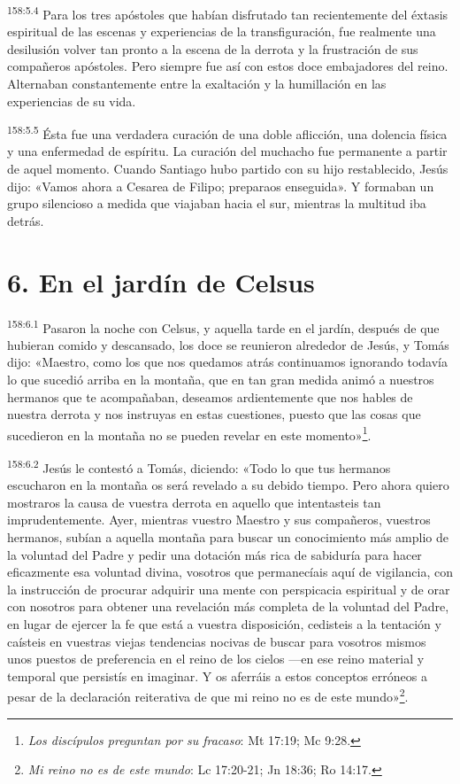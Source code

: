 \par
\textsuperscript{158:5.4} Para los tres apóstoles que habían disfrutado tan recientemente del éxtasis espiritual de las escenas y experiencias de la transfiguración, fue realmente una desilusión volver tan pronto a la escena de la derrota y la frustración de sus compañeros apóstoles. Pero siempre fue así con estos doce embajadores del reino. Alternaban constantemente entre la exaltación y la humillación en las experiencias de su vida.

\par
\textsuperscript{158:5.5} Ésta fue una verdadera curación de una doble aflicción, una dolencia física y una enfermedad de espíritu. La curación del muchacho fue permanente a partir de aquel momento. Cuando Santiago hubo partido con su hijo restablecido, Jesús dijo: «Vamos ahora a Cesarea de Filipo; preparaos enseguida». Y formaban un grupo silencioso a medida que viajaban hacia el sur, mientras la multitud iba detrás.

\section*{6. En el jardín de Celsus}
\par
\textsuperscript{158:6.1} Pasaron la noche con Celsus, y aquella tarde en el jardín, después de que hubieran comido y descansado, los doce se reunieron alrededor de Jesús, y Tomás dijo: «Maestro, como los que nos quedamos atrás continuamos ignorando todavía lo que sucedió arriba en la montaña, que en tan gran medida animó a nuestros hermanos que te acompañaban, deseamos ardientemente que nos hables de nuestra derrota y nos instruyas en estas cuestiones, puesto que las cosas que sucedieron en la montaña no se pueden revelar en este momento»\footnote{\textit{Los discípulos preguntan por su fracaso}: Mt 17:19; Mc 9:28.}.

\par
\textsuperscript{158:6.2} Jesús le contestó a Tomás, diciendo: «Todo lo que tus hermanos escucharon en la montaña os será revelado a su debido tiempo. Pero ahora quiero mostraros la causa de vuestra derrota en aquello que intentasteis tan imprudentemente. Ayer, mientras vuestro Maestro y sus compañeros, vuestros hermanos, subían a aquella montaña para buscar un conocimiento más amplio de la voluntad del Padre y pedir una dotación más rica de sabiduría para hacer eficazmente esa voluntad divina, vosotros que permanecíais aquí de vigilancia, con la instrucción de procurar adquirir una mente con perspicacia espiritual y de orar con nosotros para obtener una revelación más completa de la voluntad del Padre, en lugar de ejercer la fe que está a vuestra disposición, cedisteis a la tentación y caísteis en vuestras viejas tendencias nocivas de buscar para vosotros mismos unos puestos de preferencia en el reino de los cielos ---en ese reino material y temporal que persistís en imaginar. Y os aferráis a estos conceptos erróneos a pesar de la declaración reiterativa de que mi reino no es de este mundo»\footnote{\textit{Mi reino no es de este mundo}: Lc 17:20-21; Jn 18:36; Ro 14:17.}.


